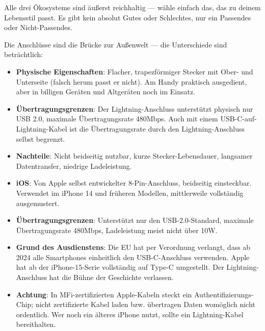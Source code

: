 Alle drei Ökosysteme sind äußerst reichhaltig — wähle einfach das, das zu deinem Lebensstil passt. Es gibt kein absolut Gutes oder Schlechtes, nur ein Passendes oder Nicht-Passendes.


Die Anschlüsse sind die Brücke zur Außenwelt — die Unterschiede sind beträchtlich:


\begin{itemize}
  \item \textbf{Physische Eigenschaften}: Flacher, trapezförmiger Stecker mit Ober- und Unterseite (falsch herum passt er nicht). Am Handy praktisch ausgedient, aber in billigen Geräten und Altgeräten noch im Einsatz.
  \item \textbf{Übertragungsgrenzen}: Der Lightning-Anschluss unterstützt physisch nur USB 2.0, maximale Übertragungsrate 480Mbps. Auch mit einem USB-C-auf-Lightning-Kabel ist die Übertragungsrate durch den Lightning-Anschluss selbst begrenzt.
  \item \textbf{Nachteile}: Nicht beidseitig nutzbar, kurze Stecker-Lebensdauer, langsamer Datentransfer, niedrige Ladeleistung.
\end{itemize}


\begin{itemize}
  \item \textbf{iOS}: Von Apple selbst entwickelter 8-Pin-Anschluss, beidseitig einsteckbar. Verwendet im iPhone 14 und früheren Modellen, mittlerweile vollständig ausgemustert.
  \item \textbf{Übertragungsgrenzen}: Unterstützt nur den USB-2.0-Standard, maximale Übertragungsrate 480Mbps, Ladeleistung meist nicht über 10W.
  \item \textbf{Grund des Ausdienstens}: Die EU hat per Verordnung verlangt, dass ab 2024 alle Smartphones einheitlich den USB-C-Anschluss verwenden. Apple hat ab der iPhone-15-Serie vollständig auf Type-C umgestellt. Der Lightning-Anschluss hat die Bühne der Geschichte verlassen.
  \item \textbf{Achtung}: In MFi-zertifizierten Apple-Kabeln steckt ein Authentifizierungs-Chip; nicht zertifizierte Kabel laden bzw. übertragen Daten womöglich nicht ordentlich. Wer noch ein älteres iPhone nutzt, sollte ein Lightning-Kabel bereithalten.
\end{itemize}

